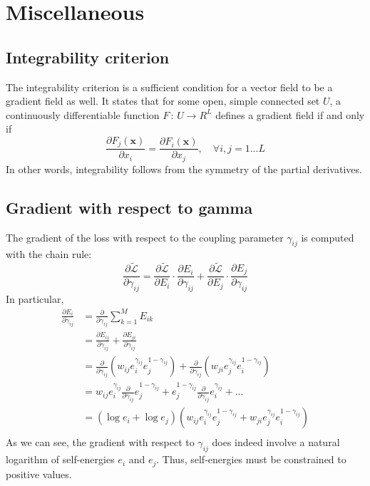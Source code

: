 \chapter{Miscellaneous}\label{chapter-misc} 

\section{Integrability criterion}\label{sec:criterion}
The integrability criterion \citep{integrability-criterion} is a sufficient condition for a vector field to be a gradient field as well. It states that for some open, simple connected set $U$, a continuously differentiable function $F\,:\,U\rightarrow R^L$ defines a gradient field if and only if
\begin{equation}
\frac{\partial F_j(\textbf{x})}{\partial x_i} = \frac{\partial F_i(\textbf{x})}{\partial x_j}, \quad \forall i,j = 1...L
\end{equation}
In other words, integrability follows from the symmetry of the partial derivatives.

\section{Gradient with respect to gamma}\label{sec:log-gradient}
The gradient of the loss with respect to the coupling parameter $\gamma_{ij}$ is computed with the chain rule:
\begin{equation}
\frac{\partial \tilde{\mathcal{L}}}{\partial \gamma_{ij}} = \frac{\partial \tilde{\mathcal{L}}}{\partial E_i} \cdot \frac{\partial E_i}{\partial \gamma_{ij}} + \frac{\partial \tilde{\mathcal{L}}}{\partial E_j} \cdot \frac{\partial E_j}{\partial \gamma_{ij}} 
\end{equation}
In particular,
\begin{equation}
\begin{split}
\frac{\partial E_i}{\partial \gamma_{ij}} &= \frac{\partial}{\partial \gamma_{ij}} \sum_{k=1}^M E_{ik} \\
&= \frac{\partial E_{ij}}{\partial \gamma_{ij}} + \frac{\partial E_{ji}}{\partial \gamma_{ij}} \\
&= \frac{\partial}{\partial \gamma_{ij}}(w_{ij}e_i^{\gamma_{ij}} e_j^{1-\gamma_{ij}}) + \frac{\partial}{\partial \gamma_{ij}}(w_{ji}e_j^{\gamma_{ij}} e_i^{1-\gamma_{ij}})\\
&= w_{ij}e_i^{\gamma_{ij}}\frac{\partial}{\partial \gamma_{ij}}e_j^{1-\gamma_{ij}} + e_j^{1-\gamma_{ij}}\frac{\partial}{\partial \gamma_{ij}}e_i^{\gamma_{ij}} + ...\\
&= (\log e_i + \log e_j)(w_{ij}e_i^{\gamma_{ij}}e_j^{1-\gamma_{ij}} + w_{ji}e_j^{\gamma_{ij}}e_i^{1-\gamma_{ij}})\\
\end{split}
\end{equation}
As we can see, the gradient with respect to $\gamma_{ij}$ does indeed involve a natural logarithm of self-energies $e_i$ and $e_j$. Thus, self-energies must be constrained to positive values.


